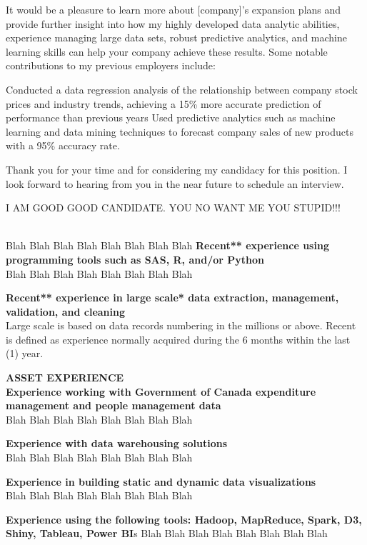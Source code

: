 It would be a pleasure to learn more about [company]’s expansion plans and provide further insight into how my highly developed data analytic abilities, experience managing large data sets, robust predictive analytics, and machine learning skills can help your company achieve these results. Some notable contributions to my previous employers include:

Conducted a data regression analysis of the relationship between company stock prices and industry trends, achieving a 15\% more accurate prediction of performance than previous years
Used predictive analytics such as machine learning and data mining techniques to forecast company sales of new products with a 95\% accuracy rate.

Thank you for your time and for considering my candidacy for this position. I look forward to hearing from you in the near future to schedule an interview.


I AM GOOD GOOD CANDIDATE. YOU NO WANT ME YOU STUPID!!! \\
\bigskip



\textbf{}\\
Blah Blah Blah Blah Blah Blah Blah Blah 
\textbf{Recent** experience using programming tools such as SAS, R, and/or Python}\\
Blah Blah Blah Blah Blah Blah Blah Blah 

\textbf{Recent** experience in large scale* data extraction, management, validation, and cleaning}\\
Large scale is based on data records numbering in the millions or above.
Recent is defined as experience normally acquired during the 6 months within the last (1) year.


\textbf{ASSET EXPERIENCE\\}
\bigskip
\textbf{Experience working with Government of Canada expenditure management and people management data\\}
Blah Blah Blah Blah Blah Blah Blah Blah 

\textbf{Experience with data warehousing solutions\\}
Blah Blah Blah Blah Blah Blah Blah Blah 

\textbf{Experience in building static and dynamic data visualizations\\}
Blah Blah Blah Blah Blah Blah Blah Blah 

\textbf{Experience using the following tools: Hadoop, MapReduce, Spark, D3, Shiny, Tableau, Power BI}s
Blah Blah Blah Blah Blah Blah Blah Blah 

